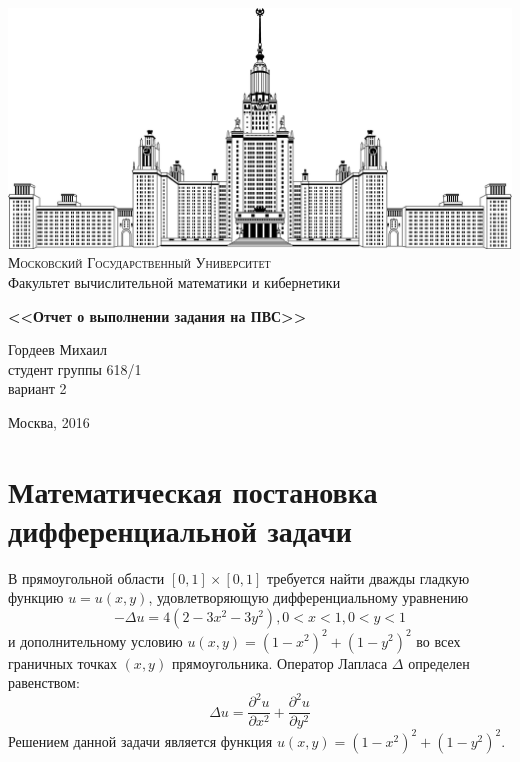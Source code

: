 \documentclass [12pt, a4paper] {article}
\begin{document}
\thispagestyle {empty}

\begin {center}
    \ \vspace{-4cm}

    \includegraphics [width = 0.5 \textwidth] {msu.png} \\
    {\scshape Московский Государственный Университет} \\
    Факультет вычислительной математики и кибернетики\\

    \vspace {5cm}



    {\Huge \bfseries
    <<Отчет о выполнении задания на ПВС>> \\}
\end {center}

\vfill
\vfill

\begin {flushright}
    \large
    Гордеев Михаил \\
    студент группы 618/1 \\
    вариант 2 \\

    \vspace {5mm}
\end {flushright}

\vfill

\begin {center}
    Москва, 2016
\end {center}

\enlargethispage {4 \baselineskip}

\newpage

\section{Математическая постановка дифференциальной задачи} В прямоугольной
области $[0,1] \times [0,1]$ требуется найти дважды гладкую функцию $u =
u(x,y)$, удовлетворяющую дифференциальному уравнению $$ -\Delta{u} = 4(2 - 3x^2
- 3y^2), 0<x<1, 0<y<1 $$ и дополнительному условию $u(x,y) = (1-x^2)^2 +
(1-y^2)^2$ во всех граничных точках $(x, y)$ прямоугольника.  Оператор Лапласа
$\Delta$ определен равенством: $$ \Delta{u} = \frac{\partial^2u}{\partial{x^2}}
+ \frac{\partial^2u}{\partial{y^2}} $$ Решением данной задачи является функция
$u(x,y) = (1-x^2)^2 + (1-y^2)^2$.
\end{document}
